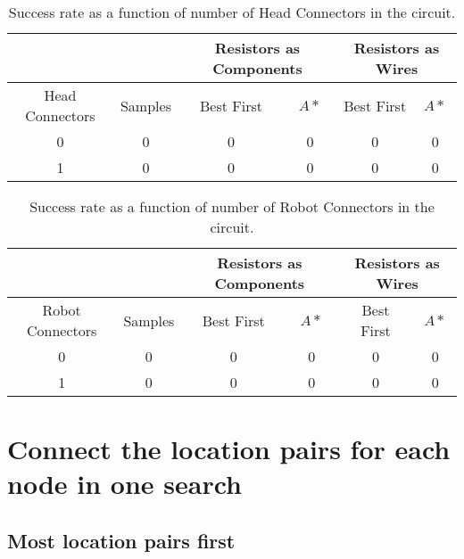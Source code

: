 \begin{table}[H]
\begin{center}
\begin{singlespace}
\begin{tabular}{| c | c || c | c | c | c |}
\hline
 & & \multicolumn{2}{|c|}{Resistors as Components} & \multicolumn{2}{|c|}{
 Resistors as Wires} \\
\hline
Head Connectors & Samples & Best First & $A*$ & Best First & $A*$ \\
\hline\hline
0 & 0 & 0 & 0 & 0 & 0 \\
1 & 0 & 0 & 0 & 0 & 0 \\
\hline
\end{tabular}
\end{singlespace}
\end{center}
\caption{Success rate as a function of number of Head Connectors in the circuit.}
\end{table}

\begin{table}[H]
\begin{center}
\begin{singlespace}
\begin{tabular}{| c | c || c | c | c | c |}
\hline
 & & \multicolumn{2}{|c|}{Resistors as Components} & \multicolumn{2}{|c|}{
 Resistors as Wires} \\
\hline
Robot Connectors & Samples & Best First & $A*$ & Best First & $A*$ \\
\hline\hline
0 & 0 & 0 & 0 & 0 & 0 \\
1 & 0 & 0 & 0 & 0 & 0 \\
\hline
\end{tabular}
\end{singlespace}
\end{center}
\caption{Success rate as a function of number of Robot Connectors in the circuit.}
\end{table}

\section{Connect the location pairs for each node in one search}
\label{sec:per_node}

\subsection{Most location pairs first}

